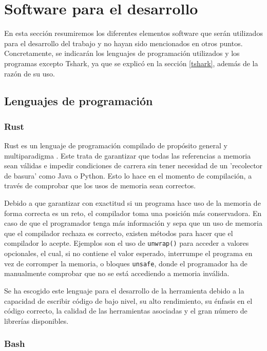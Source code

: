 \section{Software para el desarrollo}

En esta sección resumiremos los diferentes elementos software que serán utilizados para el desarrollo del trabajo y no hayan sido mencionados en otros puntos. Concretamente, se indicarán los lenguajes de programación utilizados y los programas excepto Tshark, ya que se explicó en la sección \ref{tshark}, además de la razón de su uso.

\subsection{Lenguajes de programación}

\subsubsection{Rust}

Rust es un lenguaje de programación compilado de propósito general y multiparadigma \cite{blandy2017programming} \cite{klabnik2018rust}. Este trata de garantizar que todas las referencias a memoria sean válidas e impedir condiciones de carrera sin tener necesidad de un 'recolector de basura' como Java o Python. Esto lo hace en el momento de compilación, a través de comprobar que los usos de memoria sean correctos. 

Debido a que garantizar con exactitud si un programa hace uso de la memoria de forma correcta es un reto, el compilador toma una posición más conservadora. En caso de que el programador tenga más información y sepa que un uso de memoria que el compilador rechaza es correcto, existen métodos para hacer que el compilador lo acepte. Ejemplos son el uso de \texttt{unwrap()} para acceder a valores opcionales, el cual, si no contiene el valor esperado, interrumpe el programa en vez de corromper la memoria, o bloques \texttt{unsafe}, donde el programador ha de manualmente comprobar que no se está accediendo a memoria inválida.

Se ha escogido este lenguaje para el desarrollo de la herramienta debido a la capacidad de escribir código de bajo nivel, su alto rendimiento, su énfasis en el código correcto, la calidad de las herramientas asociadas y el gran número de librerías disponibles. 

\subsubsection{Bash}

